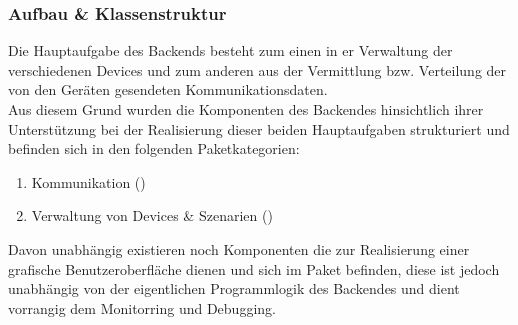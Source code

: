\subsubsection{Aufbau \& Klassenstruktur}
Die Hauptaufgabe des Backends besteht zum einen in er Verwaltung der verschiedenen Devices und zum anderen aus der Vermittlung
bzw. Verteilung der von den Geräten gesendeten Kommunikationsdaten.
\\
Aus diesem Grund wurden die Komponenten des Backendes hinsichtlich ihrer Unterstützung bei der Realisierung dieser beiden Hauptaufgaben
strukturiert und befinden sich in den folgenden Paketkategorien:
\begin{enumerate}
	\item{Kommunikation ()}
	\item{Verwaltung von Devices \& Szenarien ()}
\end{enumerate}
Davon unabhängig existieren noch Komponenten die zur Realisierung einer grafische Benutzeroberfläche dienen und sich im Paket 
 befinden, diese ist jedoch 
unabhängig von der eigentlichen Programmlogik des Backendes und dient vorrangig dem Monitorring und Debugging.

